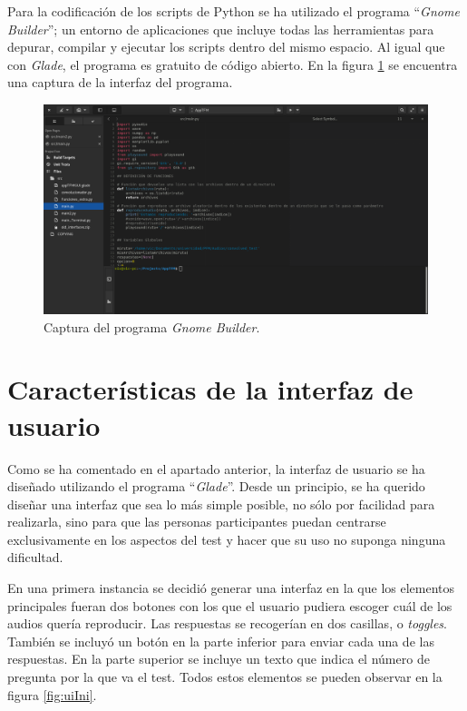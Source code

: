 \documentclass[11pt,a4paper,twoside]{book}
\begin{document}
           \newpage

           Para la codificación de los scripts de Python se ha utilizado el programa ``\textit{Gnome Builder}''; un entorno de aplicaciones que incluye todas las herramientas para depurar, compilar y ejecutar los scripts dentro del mismo espacio. Al igual que con \textit{Glade}, el programa es gratuito de código abierto. En la figura \ref{fig:builderIni} se encuentra una captura de la interfaz del programa.
           
            \begin{figure}[H]
                \begin{center}
                    \includegraphics[scale=.2]{../imagenes/builderIni.png}
                    \caption{Captura del programa \textit{Gnome Builder}.}
                    \label{fig:builderIni}
                \end{center}
            \end{figure}
            
        \section{Características de la interfaz de usuario}
            Como se ha comentado en el apartado anterior, la interfaz de usuario se ha diseñado utilizando el programa ``\textit{Glade}''. Desde un principio, se ha querido diseñar una interfaz que sea lo más simple posible, no sólo por facilidad para realizarla, sino para que las personas participantes puedan centrarse exclusivamente en los aspectos del test y hacer que su uso no suponga ninguna dificultad.  
            
            En una primera instancia se decidió generar una interfaz en la que los elementos principales fueran dos botones con los que el usuario pudiera escoger cuál de los audios quería reproducir. Las respuestas se recogerían en dos casillas, o \textit{toggles}. También se incluyó un botón en la parte inferior para enviar cada una de las respuestas. En la parte superior se incluye un texto que indica el número de pregunta por la que va el test. Todos estos elementos se pueden observar en la figura \ref{fig:uiIni}.
            
\end{document}
